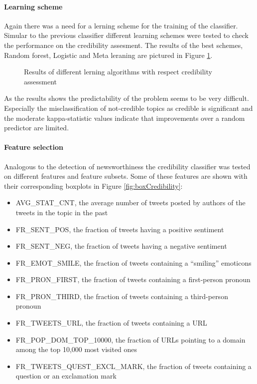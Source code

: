 \documentclass{proseminar}
\begin{document}
\paragraph{Learning scheme}
Again there was a need for a lerning scheme for the training of the classifier. Simular to the previous classifier different learning schemes were tested to check the performance on the credibility assesment. The results of the best schemes, Random forest, Logistic and Meta leraning are pictured in Figure \ref{fig:schemeCredibility}.

\begin{figure}[h]
\centering
{}
\caption{Results of different lerning algorithms with respect credibility assessment}
\label{fig:schemeCredibility}
\end{figure}

As the results shows the predictability of the problem seems to be very difficult. Especially the misclassification of not-credible topics as credible is significant and the moderate kappa-statistic values indicate that improvements over a random predictor are limited.

\paragraph{Feature selection}
Analogous to the detection of newsworthiness the credibility classifier was tested on different features and feature subsets. Some of these features are shown with their corresponding boxplots in Figure \ref{fig:boxCredibility}:

\begin{itemize}
\item AVG\_STAT\_CNT, the average number of tweets posted by authors of the tweets in the topic in the past
\item FR\_SENT\_POS, the fraction of tweets having a positive sentiment
\item FR\_SENT\_NEG, the fraction of tweets having a negative sentiment
\item FR\_EMOT\_SMILE, the fraction of tweets containing a “smiling” emoticons
\item FR\_PRON\_FIRST, the fraction of tweets containing a first-person pronoun
\item FR\_PRON\_THIRD, the fraction of tweets containing a third-person pronoun
\item FR\_TWEETS\_URL, the fraction of tweets containing a URL
\item FR\_POP\_DOM\_TOP\_10000, the fraction of URLs pointing to a domain among the top 10,000 most visited ones
\item FR\_TWEETS\_QUEST\_EXCL\_MARK, the fraction of tweets containing a question or an exclamation mark
\end{itemize}
\end{document}
